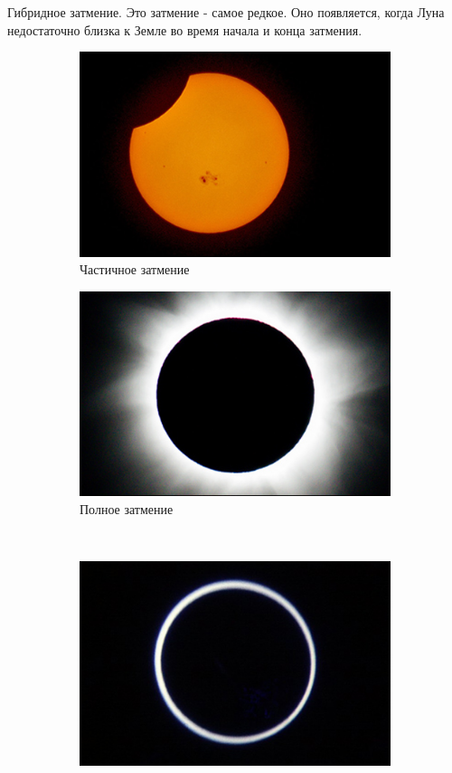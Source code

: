 \documentclass{article}
\begin{document}
	Гибридное затмение. Это затмение - самое редкое. Оно появляется, когда Луна недостаточно близка к
	Земле во время начала и конца затмения.
	\begin{figure}[p]
		\centering
		\begin{subfigure}{0.3\textwidth}
			\centering
			\includegraphics[scale = 0.4]{img/partial}
			\caption{Частичное затмение}
		\end{subfigure}\hspace{0.2\textwidth}
		\begin{subfigure}{0.3\textwidth}
			\centering
			\includegraphics[scale = 0.4]{img/full}
			\caption{Полное затмение}		
		\end{subfigure}\\
		\begin{subfigure}{0.3\textwidth}
			\centering
			\includegraphics[scale = 0.4]{img/circle}

\end{subfigure}
\end{figure}
\end{document}
